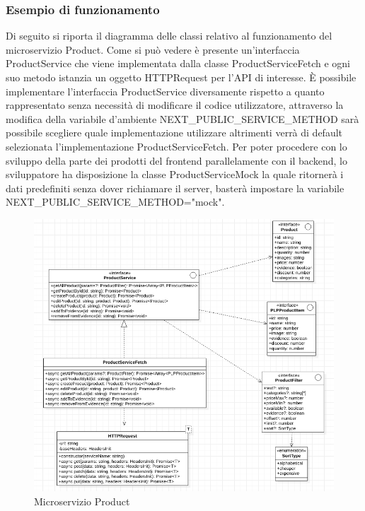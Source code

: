 \subsubsection{Esempio di funzionamento}
Di seguito si riporta il diagramma delle classi relativo al funzionamento del microservizio Product. Come si può vedere è presente un'interfaccia ProductService che viene implementata dalla classe ProductServiceFetch e ogni suo metodo istanzia un oggetto HTTPRequest per l'API di interesse. È possibile implementare l'interfaccia ProductService diversamente rispetto a quanto rappresentato senza necessità di modificare il codice utilizzatore, attraverso la modifica della variabile d'ambiente NEXT\_PUBLIC\_SERVICE\_METHOD sarà possibile scegliere quale implementazione utilizzare altrimenti verrà di default selezionata l'implementazione ProductServiceFetch. 
Per poter procedere con lo sviluppo della parte dei prodotti del frontend parallelamente con il backend, lo sviluppatore ha disposizione la classe ProductServiceMock la quale ritornerà i dati predefiniti senza dover richiamare il server, basterà impostare la variabile NEXT\_PUBLIC\_SERVICE\_METHOD="mock".
\begin{figure}[H]
	\centering
	\includegraphics[width=\textwidth]{Immagini/Frontend/ProductService.png}
	\caption{Microservizio Product}
	\label{fig:fe-productservice}
\end{figure}

